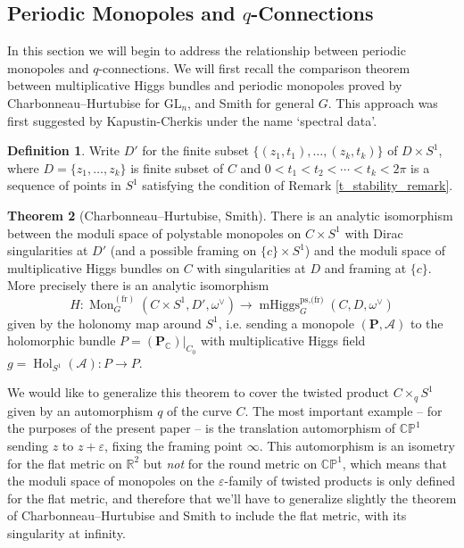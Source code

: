 \documentclass[11pt, oneside, reqno]{amsart}
\theoremstyle{definition} \newtheorem{definition}{Definition}[section]
\newtheorem{theorem}[definition]{Theorem}
\theoremstyle{definition} \newtheorem{remark}[definition]{Remark}
\theoremstyle{definition} \newtheorem{remarks}[definition]{Remarks}
\theoremstyle{definition} \newtheorem{question}[definition]{Question}
\theoremstyle{definition} \newtheorem*{note}{Note}
\theoremstyle{definition} \newtheorem{example}[definition]{Example}
\theoremstyle{definition} \newtheorem{examples}[definition]{Examples}
\newcommand{\bb}[1]{\mathbb{#1}}
\newcommand{\mc}[1]{\mathcal{#1}}
\newcommand{\bo}[1]{\boldsymbol{#1}}
\newcommand{\CC}{\mathbb{C}}
\newcommand{\RR}{\mathbb{R}}
\newcommand{\eps}{\varepsilon}
\newcommand{\GL}{\mathrm{GL}}
\DeclareMathOperator{\mhiggs}{mHiggs}
\DeclareMathOperator{\mon}{Mon}
\DeclareMathOperator{\Hol}{Hol}
\newcommand{\fr}{\mathrm{fr}}
\begin{document}
\subsection{Periodic Monopoles and $q$-Connections}
In this section we will begin to address the relationship between periodic monopoles and $q$-connections.  We will first recall the comparison theorem between multiplicative Higgs bundles and periodic monopoles proved by Charbonneau--Hurtubise \cite{CharbonneauHurtubise} for $\GL_n$, and Smith \cite{Smith} for general $G$. This approach was first suggested by Kapustin-Cherkis \cite{CherkisKapustin2} under the name `spectral data'. 

\begin{definition}
Write $D'$ for the finite subset $\{(z_1,t_1), \ldots, (z_k, t_k)\}$ of $D \times S^1$, where $D = \{z_1, \ldots, z_k\}$ is finite subset of $C$ and $0 < t_1 < t_2 < \cdots < t_k < 2\pi$ is a sequence of points in $S^1$ satisfying the condition of Remark \ref{t_stability_remark}.
\end{definition}

\begin{theorem}[Charbonneau--Hurtubise, Smith] \label{CHS_thm}
There is an analytic isomorphism between the moduli space of polystable monopoles on $C \times S^1$ with Dirac singularities at $D'$ (and a possible framing on $\{c\} \times S^1$) and the moduli space of multiplicative Higgs bundles on $C$ with singularities at $D$ and framing at $\{c\}$.  More precisely there is an analytic isomorphism
\[H \colon \mon^{(\fr)}_G(C \times S^1, D', \omega^\vee) \to \mhiggs_G^{\text{ps,(fr)}}(C, D, \omega^\vee)\]
given by the holonomy map around $S^1$, i.e. sending a monopole $(\bo P, \mc A)$ to the holomorphic bundle $P = (\bo P_\CC)|_{C_0}$ with multiplicative Higgs field $g = \Hol_{S^1}(\mc A) \colon P \to P$.
\end{theorem}

We would like to generalize this theorem to cover the twisted product $C \times_q S^1$ given by an automorphism $q$ of the curve $C$.  The most important example -- for the purposes of the present paper -- is the translation automorphism of $\bb{CP}^1$ sending $z$ to $z + \eps$, fixing the framing point $\infty$.  This automorphism is an isometry for the flat metric on $\RR^2$ but \emph{not} for the round metric on $\bb{CP}^1$, which means that the moduli space of monopoles on the $\eps$-family of twisted products is only defined for the flat metric, and therefore that we'll have to generalize slightly the theorem of Charbonneau--Hurtubise and Smith to include the flat metric, with its singularity at infinity.
\end{document}

